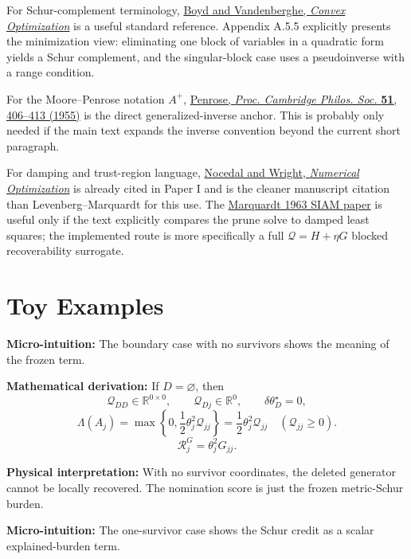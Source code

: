\documentclass[10pt,twocolumn]{article}
\newcommand{\blocktitle}[1]{\vspace{2pt}\noindent\textbf{#1}\space}
\newcommand{\micro}[1]{\blocktitle{Micro-intuition:} #1}
\newcommand{\deriv}{\blocktitle{Mathematical derivation:}}
\newcommand{\phys}[1]{\blocktitle{Physical interpretation:} #1}
\begin{document}
For Schur-complement terminology, \href{https://web.stanford.edu/~boyd/cvxbook/bv_cvxbook.pdf}{Boyd and Vandenberghe, \emph{Convex Optimization}} is a useful standard reference. Appendix A.5.5 explicitly presents the minimization view: eliminating one block of variables in a quadratic form yields a Schur complement, and the singular-block case uses a pseudoinverse with a range condition.

For the Moore--Penrose notation \(A^+\), \href{https://www.cambridge.org/core/journals/mathematical-proceedings-of-the-cambridge-philosophical-society/article/generalized-inverse-for-matrices/5F4516D6B9989BB6563A4B267CC7D615}{Penrose, \emph{Proc. Cambridge Philos. Soc.} \textbf{51}, 406--413 (1955)} is the direct generalized-inverse anchor. This is probably only needed if the main text expands the inverse convention beyond the current short paragraph.

For damping and trust-region language, \href{https://link.springer.com/book/10.1007/b98874}{Nocedal and Wright, \emph{Numerical Optimization}} is already cited in Paper I and is the cleaner manuscript citation than Levenberg--Marquardt for this use. The \href{https://epubs.siam.org/doi/10.1137/0111030}{Marquardt 1963 SIAM paper} is useful only if the text explicitly compares the prune solve to damped least squares; the implemented route is more specifically a full \(\mathcal Q=H+\eta G\) blocked recoverability surrogate.

\section*{Toy Examples}

\micro{The boundary case with no survivors shows the meaning of the frozen term.}

\deriv
If \(D=\varnothing\), then
\[
\mathcal Q_{DD}\in\mathbb R^{0\times0},
\qquad
\mathcal Q_{Dj}\in\mathbb R^0,
\qquad
\delta\theta_D^\star=0,
\]
\[
\Lambda(A_j)
=
\max\left\{
0,\frac12\theta_j^2\mathcal Q_{jj}
\right\}
=
\frac12\theta_j^2\mathcal Q_{jj}
\quad
(\mathcal Q_{jj}\ge0).
\]
\[
\mathcal R_j^G
=
\theta_j^2G_{jj}.
\]

\phys{With no survivor coordinates, the deleted generator cannot be locally recovered. The nomination score is just the frozen metric-Schur burden.}

\micro{The one-survivor case shows the Schur credit as a scalar explained-burden term.}
\end{document}
